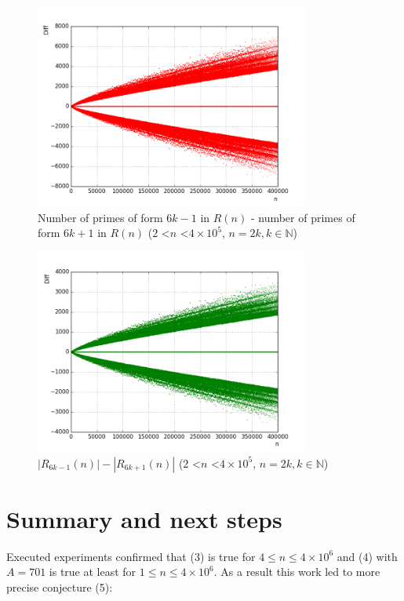 \documentclass[10pt,twocolumn]{article}
\begin{document}
\begin{figure}[ht]
\centering
\captionsetup{justification=centering}
\includegraphics[width=9cm]{f_hypo_6kpm1_count1}
\caption{ Number of primes of form $6k-1$ in $R(n)$ - number of primes of form $6k+1$ in $R(n)$ ($2$ \textless $n$ \textless $4 \times 10^5$, $n = 2k, k \in \mathbb{N}$)}
\label{fig:hypo6kpm1c1}
\end{figure}

\begin{figure}[!ht]
\centering
\captionsetup{justification=centering}
\includegraphics[width=9cm]{f_hypo_6kpm1_count2}
\caption{ $\left\vert R_{6k - 1}(n) \right\vert - \left\vert R_{6k + 1}(n) \right\vert$ ($2$ \textless $n$ \textless $4 \times 10^5$, $n = 2k, k \in \mathbb{N}$)}
\label{fig:hypo6kpm1c2}
\end{figure}

\section{Summary and next steps}

Executed experiments confirmed that (3) is true for $4 \leq n \leq 4 \times 10^6$ and (4) with $A=701$ is true at least for $1 \leq n \leq 4 \times 10^6$. As a result this work led to more precise conjecture (5):
\end{document}
